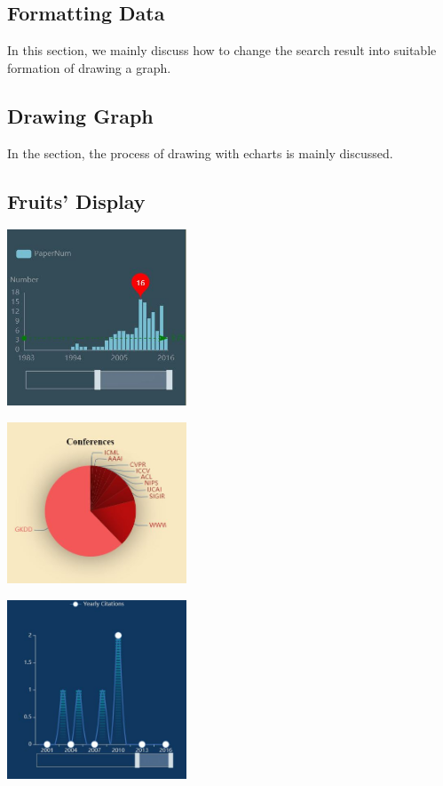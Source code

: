 \documentclass[10pt,twoside,a4paper,titlepage]{article}
\begin{document}
	\subsection{Formatting Data}
		\par In this section, we mainly discuss how to change the search result into suitable formation of drawing a graph. 

	\subsection{Drawing Graph}
		\par In the section, the process of drawing with echarts is mainly discussed.

	\subsection{Fruits' Display}
		\includegraphics[width=0.4\textwidth]{gjl/11.jpg}\newline\par
		\includegraphics[width=0.4\textwidth]{gjl/12.jpg}\newline\par
		\includegraphics[width=0.4\textwidth]{gjl/21.jpg}\newline\par
\end{document}
